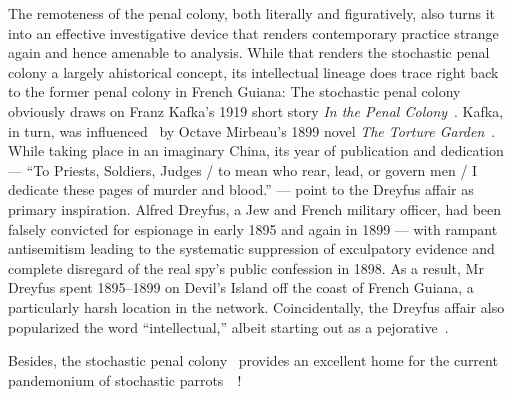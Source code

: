 The remoteness of the penal colony, both literally and figuratively, also turns
it into an effective investigative device that renders contemporary practice
strange again and hence amenable to analysis. While that renders the stochastic
penal colony a largely ahistorical concept, its intellectual lineage does trace
right back to the former penal colony in French Guiana: The stochastic penal
colony obviously draws on Franz Kafka's 1919 short story \emph{In the Penal
Colony}~\cite{Kafka1995}. Kafka, in turn, was influenced~\cite{Robertson2017} by
Octave Mirbeau's 1899 novel \emph{The Torture Garden}~\cite{Mirbeau2008}. While
taking place in an imaginary China, its year of publication and dedication ---
``To Priests, Soldiers, Judges / to mean who rear, lead, or govern men / I
dedicate these pages of murder and blood.'' --- point to the Dreyfus affair as
primary inspiration. Alfred Dreyfus, a Jew and French military officer, had been
falsely convicted for espionage in early 1895 and again in 1899 --- with rampant
antisemitism leading to the systematic suppression of exculpatory evidence and
complete disregard of the real spy's public confession in 1898. As a result, Mr
Dreyfus spent 1895--1899 on Devil's Island off the coast of French Guiana, a
particularly harsh location in the network. Coincidentally, the Dreyfus affair
also popularized the word ``intellectual,'' albeit starting out as a
pejorative~\cite{Drake2005,StudentsAtTheUniversityOfBristol2021}.

Besides, the stochastic penal colony~ provides an excellent
home for the current pandemonium of stochastic
parrots~~\cite{BenderGebruea2021}!
